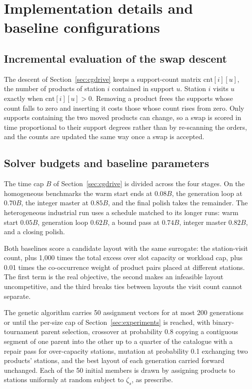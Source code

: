 \documentclass[]{interact}
\begin{document}
\section{Implementation details and baseline configurations}\label{app:impl}
\subsection{Incremental evaluation of the swap descent}\label{app:swapeval}
The descent of Section~\ref{sec:cgdrive} keeps a support-count matrix $\mathrm{cnt}[i][u]$, the number of products of station $i$ contained in support $u$. Station $i$ visits $u$ exactly when $\mathrm{cnt}[i][u]>0$. Removing a product frees the supports whose count falls to zero and inserting it costs those whose count rises from zero. Only supports containing the two moved products can change, so a swap is scored in time proportional to their support degrees rather than by re-scanning the orders, and the counts are updated the same way once a swap is accepted.

\subsection{Solver budgets and baseline parameters}\label{app:baselines}
The time cap $B$ of Section~\ref{sec:cgdrive} is divided across the four stages. On the homogeneous benchmarks the warm start ends at $0.08B$, the generation loop at $0.70B$, the integer master at $0.85B$, and the final polish takes the remainder. The heterogeneous industrial run uses a schedule matched to its longer runs: warm start $0.05B$, generation loop $0.62B$, a bound pass at $0.74B$, integer master $0.82B$, and a closing polish.

Both baselines score a candidate layout with the same surrogate: the station-visit count, plus 1{,}000 times the total excess over slot capacity or workload cap, plus 0.01 times the co-occurrence weight of product pairs placed at different stations. The first term is the real objective, the second makes an infeasible layout uncompetitive, and the third breaks ties between layouts the visit count cannot separate.

The genetic algorithm carries 50 assignment vectors for at most 200 generations or until the per-size cap of Section~\ref{sec:experiments} is reached, with binary-tournament parent selection, crossover at probability 0.8 copying a contiguous segment of one parent into the other up to a quarter of the catalogue with a repair pass for over-capacity stations, mutation at probability 0.1 exchanging two products' stations, and the best layout of each generation carried forward unchanged. Each of the 50 initial members is drawn by assigning products to stations uniformly at random subject to $\zeta_s$, as \citet{pan2015} prescribe.
\end{document}
